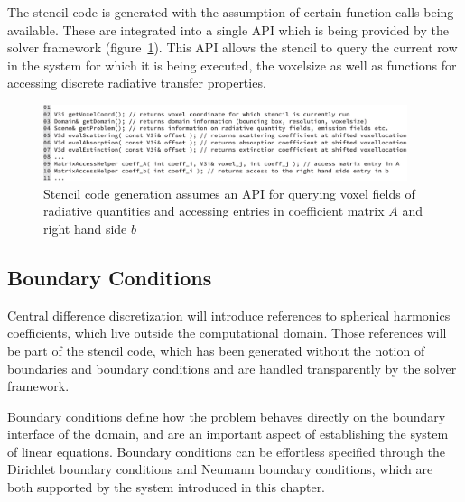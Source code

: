 The stencil code is generated with the assumption of certain function calls being available. These are integrated into a single API which is being provided by the solver framework (figure~\ref{fig:pn_discretization_codegen_stencilAPI}). This API allows the stencil to query the current row in the system for which it is being executed, the voxelsize as well as functions for accessing discrete radiative transfer properties.
\begin{figure}[h]
\centering
\includegraphics[width=0.95\textwidth]{04_pn_method/figures/fig_stencil_api.pdf}
\caption{Stencil code generation assumes an API for querying voxel fields of radiative quantities and accessing entries in coefficient matrix $A$ and right hand side $b$}
\label{fig:pn_discretization_codegen_stencilAPI}
\end{figure}


\subsection{Boundary Conditions}
\label{sec:pn_bc}

Central difference discretization will introduce references to spherical harmonics coefficients, which live outside the computational domain. Those references will be part of the stencil code, which has been generated without the notion of boundaries and boundary conditions and are handled transparently by the solver framework.

Boundary conditions define how the problem behaves directly on the boundary interface of the domain, and are an important aspect of establishing the system of linear equations. Boundary conditions can be effortless specified through the Dirichlet boundary conditions and Neumann boundary conditions, which are both supported by the system introduced in this chapter.

